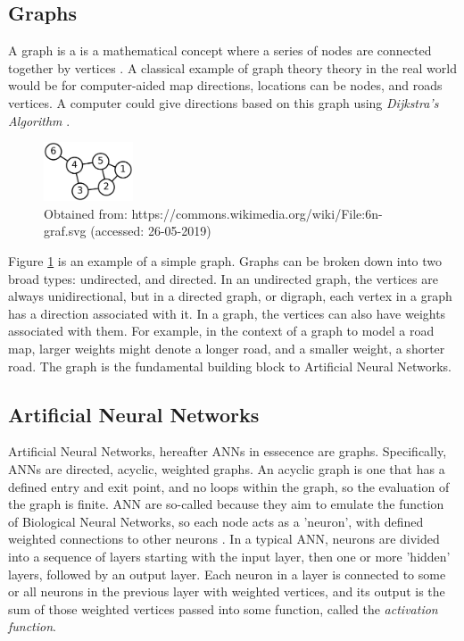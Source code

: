     \subsection{Graphs}
    A graph is a is a mathematical concept where a series of nodes are connected together by vertices \cite{chartrand2010graphs}. A classical example of graph theory theory in the real world would be for computer-aided map directions, locations can be nodes, and roads vertices. A computer could give directions based on this graph using {\slshape Dijkstra's Algorithm} \cite{dijkstra1959note}.

    \begin{figure}[h]
        \centering
        \includegraphics[width=100px]{../img/1000px-6n-graf.png}
        \caption{Obtained from: https://commons.wikimedia.org/wiki/File:6n-graf.svg (accessed: 26-05-2019)}
        \label{fig:simplegraph}
    \end{figure}

    Figure \ref{fig:simplegraph} is an example of a simple graph. Graphs can be broken down into two broad types: undirected, and directed. In an undirected graph, the vertices are always unidirectional, but in a directed graph, or digraph, each vertex in a graph has a direction associated with it. In a graph, the vertices can also have weights associated with them. For example, in the context of a graph to model a road map, larger weights might denote a longer road, and a smaller weight, a shorter road. The graph is the fundamental building block to Artificial Neural Networks.

    \subsection{Artificial Neural Networks}
    Artificial Neural Networks, hereafter ANNs in essecence are graphs. Specifically, ANNs are directed, acyclic, weighted graphs. An acyclic graph is one that has a defined entry and exit point, and no loops within the graph, so the evaluation of the graph is finite. ANN are so-called because they aim to emulate the function of Biological Neural Networks, so each node acts as a 'neuron', with defined weighted connections to other neurons \cite{hopfield1982neural}. In a typical ANN, neurons are divided into a sequence of layers starting with the input layer, then one or more 'hidden' layers, followed by an output layer. Each neuron in a layer is connected to some or all neurons in the previous layer with weighted vertices, and its output is the sum of those weighted vertices passed into some function, called the {\slshape activation function}. 

